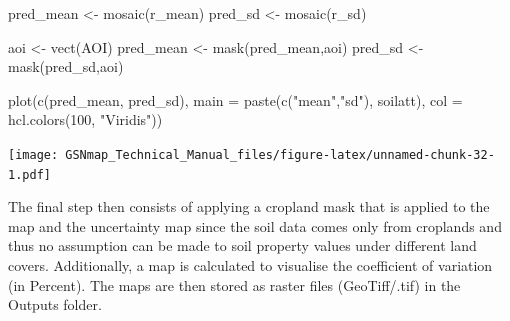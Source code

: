 \documentclass[
  10pt,
  b5paper,
  oneside]{book}
\newenvironment{Shaded}{\begin{snugshade}}{\end{snugshade}}
\newcommand{\AttributeTok}[1]{\textcolor[rgb]{0.77,0.63,0.00}{#1}}
\newcommand{\DecValTok}[1]{\textcolor[rgb]{0.00,0.00,0.81}{#1}}
\newcommand{\FunctionTok}[1]{\textcolor[rgb]{0.00,0.00,0.00}{#1}}
\newcommand{\NormalTok}[1]{#1}
\newcommand{\OtherTok}[1]{\textcolor[rgb]{0.56,0.35,0.01}{#1}}
\newcommand{\StringTok}[1]{\textcolor[rgb]{0.31,0.60,0.02}{#1}}
\begin{document}
\begin{Shaded}
\begin{Highlighting}[]
\NormalTok{  pred\_mean }\OtherTok{\textless{}{-}} \FunctionTok{mosaic}\NormalTok{(r\_mean)}
\NormalTok{  pred\_sd }\OtherTok{\textless{}{-}} \FunctionTok{mosaic}\NormalTok{(r\_sd)}
  
\NormalTok{  aoi }\OtherTok{\textless{}{-}} \FunctionTok{vect}\NormalTok{(AOI)}
\NormalTok{  pred\_mean }\OtherTok{\textless{}{-}} \FunctionTok{mask}\NormalTok{(pred\_mean,aoi)}
\NormalTok{  pred\_sd }\OtherTok{\textless{}{-}} \FunctionTok{mask}\NormalTok{(pred\_sd,aoi)}
  
  
  \FunctionTok{plot}\NormalTok{(}\FunctionTok{c}\NormalTok{(pred\_mean, pred\_sd), }\AttributeTok{main =} \FunctionTok{paste}\NormalTok{(}\FunctionTok{c}\NormalTok{(}\StringTok{"mean"}\NormalTok{,}\StringTok{"sd"}\NormalTok{), }
\NormalTok{                                           soilatt), }
       \AttributeTok{col =} \FunctionTok{hcl.colors}\NormalTok{(}\DecValTok{100}\NormalTok{, }\StringTok{"Viridis"}\NormalTok{))}
\end{Highlighting}
\end{Shaded}

\texttt{[image: GSNmap\_Technical\_Manual\_files/figure-latex/unnamed-chunk-32-1.pdf]}

The final step then consists of applying a cropland mask that is applied to the map and the uncertainty map since the soil data comes only from croplands and thus no assumption can be made to soil property values under different land covers. Additionally, a map is calculated to visualise the coefficient of variation (in Percent). The maps are then stored as raster files (GeoTiff/.tif) in the Outputs folder.
\end{document}
